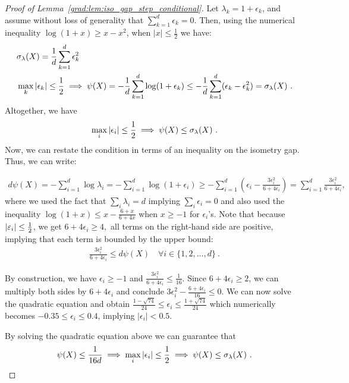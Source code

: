 \begin{proof}[Proof of Lemma~\ref{grad:lem:iso_gap_step_conditional}]
Let $\lambda_k = 1+\epsilon_k$, and assume without loss of generality that $\sum_{k=1}^d\epsilon_k = 0$. Then, using the numerical inequality $\log(1+x) \ge x - x^2$, when $|x|\le \frac12$ we have:
\begin{align}
&\sigma_\lambda(X) = \frac1d\sum_{k=1}^d\epsilon_k^2\\
&\max_k |\epsilon_k|\le \frac12 \implies \psi(X) = -\frac1d\sum_{k=1}^d\log(1+\epsilon_k) \le -\frac1d\sum_{k=1}^d (\epsilon_k - \epsilon_k^2) = \sigma_\lambda(X)~.
\end{align}
Altogether, we have
\begin{align}
\max_i |\epsilon_i| \le \frac12 \implies \psi(X) \le \sigma_\lambda(X)~.
\end{align}
Now, we can restate the condition in terms of an inequality on the isometry gap. Thus, we can write:


\begin{align}
d\psi(X) = -\sum_{i=1}^d\log\lambda_i = -\sum_{i=1}^d \log(1+\epsilon_i) \ge -\sum_{i=1}^d \left(\epsilon_i - \frac{3\epsilon_i^2}{6+4\epsilon_i}\right) = \sum_{i=1}^d \frac{3\epsilon_i^2}{6+4\epsilon_i},
\end{align}
where we used the fact that $\sum_i\lambda_i = d$ implying $\sum_i\epsilon_i = 0$ and also used the inequality $\log(1+x) \le x-\frac{6+x}{6+4x}$ when $x\ge -1$ for $\epsilon_i$'s. Note that because $|{\varepsilon}_i| \leq \frac{1}{2}$, we get $6 + 4\epsilon_i \ge 4,$ all terms on the right-hand side are positive, implying that each term is bounded by the upper bound:
\begin{align}
\frac{3\epsilon_i^2}{6+4\epsilon_i}\le d\psi(X) \quad \forall i \in \{1, 2, \dots, d\}~.
\end{align} 

By construction, we have $\epsilon_i\ge -1$ and $\frac{3\epsilon_i^2}{6+4\epsilon_i} \le \frac{1}{16}.$ Since $6+4\epsilon_i \ge 2$, we can multiply both sides by $6+4\epsilon_i$ and conclude $3\epsilon_i^2 - \frac{6+4\epsilon_i}{16} \le 0$. We can now solve the quadratic equation and obtain $\frac{1 - \sqrt{74}}{24} \le \epsilon_i \le \frac{1 + \sqrt{74}}{24}$ which numerically becomes $-0.35\le \epsilon_i \le 0.4$, implying $|\epsilon_i|< 0.5$.

By solving the quadratic equation above we can guarantee that 
\begin{equation}
\label{grad:eq:proof_iso_gap_step_conditional_eq1}
\psi(X)\le \frac{1}{16d} \implies \max_i|\epsilon_i| \le \frac12 \implies \psi(X) \le \sigma_\lambda(X)~.
\end{equation}


\end{proof}

